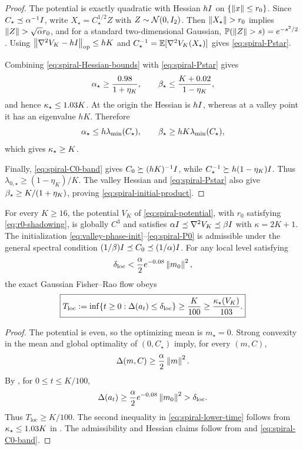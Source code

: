 \begin{proof}
The potential is exactly quadratic with Hessian $hI$ on $\{\left\lVert x\right\rVert\leq r_0\}$.  Since
$C_\star\preceq\alpha^{-1}I$, write $X_\star=C_\star^{1/2}Z$ with
$Z\sim\mathcal{N}(0,I_2)$.  Then
$\left\lVert X_\star\right\rVert>r_0$ implies $\left\lVert Z\right\rVert>\sqrt\alpha r_0$, and for a standard two-dimensional
Gaussian,
$\mathbb{P}(\left\lVert Z\right\rVert>s)=e^{-s^2/2}$.  Using
$\left\lVert \nabla^2V_K-hI\right\rVert_{\mathrm{op}}\leq hK$ and
$C_\star^{-1}=\mathbb{E}[\nabla^2V_K(X_\star)]$ gives \eqref{eq:spiral-Pstar}.

Combining \eqref{eq:spiral-Hessian-bounds} with \eqref{eq:spiral-Pstar} gives
\[
    \alpha_\star\geq\frac{0.98}{1+\eta_K},
    \qquad
    \beta_\star\leq\frac{K+0.02}{1-\eta_K},
\]
and hence $\kappa_\star\leq1.03K$.  At the origin the Hessian is $hI$, whereas at a valley
point it has an eigenvalue $hK$.  Therefore
\[
    \alpha_\star\leq h\lambda_{\min}(C_\star),
    \qquad
    \beta_\star\geq hK\lambda_{\min}(C_\star),
\]
which gives $\kappa_\star\geq K$.

Finally, \eqref{eq:spiral-C0-band} gives
$C_0\succeq(hK)^{-1}I$, while
$C_\star^{-1}\succeq h(1-\eta_K)I$.  Thus
$\lambda_{0,\star}\geq(1-\eta_K)/K$.  The valley Hessian and
\eqref{eq:spiral-Pstar} also give
$\beta_\star\geq K/(1+\eta_K)$, proving
\eqref{eq:spiral-initial-product}.
\end{proof}

\begin{theorem}
\label{thm:spiral-sharp}
For every $K\geq16$, the potential $V_K$ of \eqref{eq:spiral-potential}, with $r_0$ satisfying
\eqref{eq:r0-shadowing}, is globally $C^3$ and satisfies
$\alpha I\preceq\nabla^2V_K\preceq\beta I$ with $\kappa=2K+1$.  The initialization
\eqref{eq:valley-phase-init}--\eqref{eq:spiral-P0} is admissible under the general spectral
condition $(1/\beta)I\preceq C_0\preceq(1/\alpha)I$.  For any local level satisfying
\begin{equation}
\label{eq:spiral-local-level}
    \delta_{\mathrm{loc}}
    <\frac\alpha2e^{-0.08}\left\lVert m_0\right\rVert^2,
\end{equation}
the exact Gaussian Fisher--Rao flow obeys
\begin{equation}
\label{eq:spiral-lower-time}
    \boxed{
    T_{\mathrm{loc}}
    :=\inf\{t\geq0:\Delta(a_t)\leq\delta_{\mathrm{loc}}\}
    \geq\frac K{100}
    \geq\frac{\kappa_\star(V_K)}{103}.}
\end{equation}
\end{theorem}

\begin{proof}
The potential is even, so the optimizing mean is $m_\star=0$.  Strong convexity in the mean and
global optimality of $(0,C_\star)$ imply, for every $(m,C)$,
\[
    \Delta(m,C)
    \geq\frac\alpha2\left\lVert m\right\rVert^2.
\]
By , for $0\leq t\leq K/100$,
\[
    \Delta(a_t)
    \geq
    \frac\alpha2e^{-0.08}\left\lVert m_0\right\rVert^2
    >\delta_{\mathrm{loc}}.
\]
Thus $T_{\mathrm{loc}}\geq K/100$.  The second inequality in
\eqref{eq:spiral-lower-time} follows from
$\kappa_\star\leq1.03K$ in .  The admissibility and Hessian claims follow
from  and \eqref{eq:spiral-C0-band}.
\end{proof}

